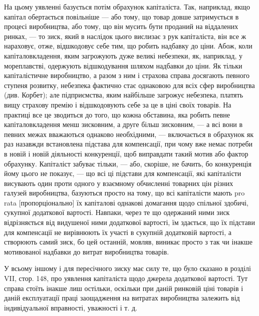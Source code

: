 На цьому уявленні базується потім обрахунок капіталіста.
Так, наприклад, якщо капітал обертається повільніше — або тому,
що товар довше затримується в процесі виробництва, або тому,
що він мусить бути проданий на віддалених ринках, — то зиск,
який в наслідок цього вислизає з рук капіталіста, він все ж нараховує,
отже, відшкодовує себе тим, що робить надбавку до
ціни. Абож, коли капіталовкладення, яким загрожують дуже
великі небезпеки, як, наприклад, у мореплавстві, одержують відшкодування
шляхом надбавки до ціни. Як тільки капіталістичне
виробництво, а разом з ним і страхова справа досягають певного
ступеня розвитку, небезпека фактично стає однаковою для
всіх сфер виробництва (див. Корбет); але підприємства, яким
найбільше загрожує небезпека, платять вищу страхову премію
і відшкодовують себе за це в ціні своїх товарів. На практиці
все це зводиться до того, що кожна обставина, яка робить
певне капіталовкладення менш зисковним, а друге більш зисковним,
— а всі вони в певних межах вважаються однаково необхідними,
— включається в обрахунок як раз назавжди встановлена
підстава для компенсації, при чому вже немає потреби в новій
і новій діяльності конкуренції, щоб виправдати такий мотив або
фактор обрахунку. Капіталіст забуває тільки, — або, скоріше,
не бачить, бо конкуренція йому цього не показує, — що всі ці
підстави для компенсації, які капіталісти висувають один проти
одного у взаємному обчисленні товарних цін різних галузей
виробництва, базуються просто на тому, що всі капіталісти мають
pro rata [пропорціонально] їх капіталові однакові домагання
щодо спільної здобичі, сукупної додаткової вартості. Навпаки,
через те що одержаний ними зиск відрізняється від видушеної
ними додаткової вартості, їм здається, що їх підстави для
компенсації не вирівнюють їх участі в сукупній додатковій
вартості, а створюють самий зиск, бо цей останній, мовляв,
виникає просто з так чи інакше мотивованої надбавки до витрат
виробництва товарів.

У всьому іншому і для пересічного зиску має силу те, що
було сказано в розділі VII, стор. 148, про уявлення капіталіста
щодо джерела додаткової вартості. Тут справа стоїть інакше
лиш остільки, оскільки при даній ринковій ціні товарів і даній
експлуатації праці заощадження на витратах виробництва залежить
від індивідуальної вправності, уважності і т. д.
